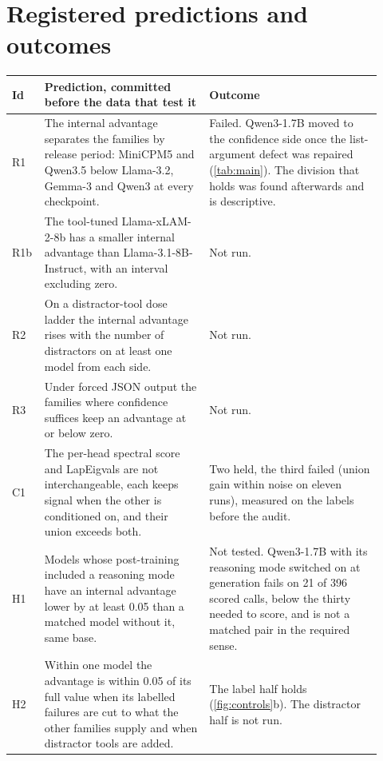 \begin{table}[h]
\centering\small
\caption{Hand audit of the labels after the first two repairs, thirty items per run stratified over failure
modes, Wilson intervals. All errors are correct calls scored as failures.}
\label{tab:postaudit}

\end{table}

\section{Registered predictions and outcomes}
\label{app:registry}

\begin{center}\small
\begin{tabular}{p{0.06\linewidth}p{0.42\linewidth}p{0.44\linewidth}}
\toprule
Id & Prediction, committed before the data that test it & Outcome \\
\midrule
R1 & The internal advantage separates the families by release period: MiniCPM5 and Qwen3.5 below Llama-3.2, Gemma-3 and Qwen3 at every checkpoint. & Failed. Qwen3-1.7B moved to the confidence side once the list-argument defect was repaired (\cref{tab:main}). The division that holds was found afterwards and is descriptive. \\
R1b & The tool-tuned Llama-xLAM-2-8b has a smaller internal advantage than Llama-3.1-8B-Instruct, with an interval excluding zero. & Not run. \\
R2 & On a distractor-tool dose ladder the internal advantage rises with the number of distractors on at least one model from each side. & Not run. \\
R3 & Under forced JSON output the families where confidence suffices keep an advantage at or below zero. & Not run. \\
C1 & The per-head spectral score and LapEigvals are not interchangeable, each keeps signal when the other is conditioned on, and their union exceeds both. & Two held, the third failed (union gain within noise on eleven runs), measured on the labels before the audit. \\
H1 & Models whose post-training included a reasoning mode have an internal advantage lower by at least 0.05 than a matched model without it, same base. & Not tested. Qwen3-1.7B with its reasoning mode switched on at generation fails on 21 of 396 scored calls, below the thirty needed to score, and is not a matched pair in the required sense. \\
H2 & Within one model the advantage is within 0.05 of its full value when its labelled failures are cut to what the other families supply and when distractor tools are added. & The label half holds (\cref{fig:controls}b). The distractor half is not run. \\
\bottomrule
\end{tabular}
\end{center}

